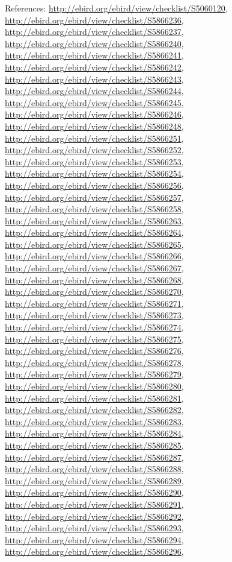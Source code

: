\documentclass[9pt, article]{memoir}
\begin{document}
\begin{multicols}{2}
\vspace{6pt}References: 
\url{http://ebird.org/ebird/view/checklist/S5060120}, 
\url{http://ebird.org/ebird/view/checklist/S5866236}, 
\url{http://ebird.org/ebird/view/checklist/S5866237}, 
\url{http://ebird.org/ebird/view/checklist/S5866240}, 
\url{http://ebird.org/ebird/view/checklist/S5866241}, 
\url{http://ebird.org/ebird/view/checklist/S5866242}, 
\url{http://ebird.org/ebird/view/checklist/S5866243}, 
\url{http://ebird.org/ebird/view/checklist/S5866244}, 
\url{http://ebird.org/ebird/view/checklist/S5866245}, 
\url{http://ebird.org/ebird/view/checklist/S5866246}, 
\url{http://ebird.org/ebird/view/checklist/S5866248}, 
\url{http://ebird.org/ebird/view/checklist/S5866251}, 
\url{http://ebird.org/ebird/view/checklist/S5866252}, 
\url{http://ebird.org/ebird/view/checklist/S5866253}, 
\url{http://ebird.org/ebird/view/checklist/S5866254}, 
\url{http://ebird.org/ebird/view/checklist/S5866256}, 
\url{http://ebird.org/ebird/view/checklist/S5866257}, 
\url{http://ebird.org/ebird/view/checklist/S5866258}, 
\url{http://ebird.org/ebird/view/checklist/S5866263}, 
\url{http://ebird.org/ebird/view/checklist/S5866264}, 
\url{http://ebird.org/ebird/view/checklist/S5866265}, 
\url{http://ebird.org/ebird/view/checklist/S5866266}, 
\url{http://ebird.org/ebird/view/checklist/S5866267}, 
\url{http://ebird.org/ebird/view/checklist/S5866268}, 
\url{http://ebird.org/ebird/view/checklist/S5866270}, 
\url{http://ebird.org/ebird/view/checklist/S5866271}, 
\url{http://ebird.org/ebird/view/checklist/S5866273}, 
\url{http://ebird.org/ebird/view/checklist/S5866274}, 
\url{http://ebird.org/ebird/view/checklist/S5866275}, 
\url{http://ebird.org/ebird/view/checklist/S5866276}, 
\url{http://ebird.org/ebird/view/checklist/S5866278}, 
\url{http://ebird.org/ebird/view/checklist/S5866279}, 
\url{http://ebird.org/ebird/view/checklist/S5866280}, 
\url{http://ebird.org/ebird/view/checklist/S5866281}, 
\url{http://ebird.org/ebird/view/checklist/S5866282}, 
\url{http://ebird.org/ebird/view/checklist/S5866283}, 
\url{http://ebird.org/ebird/view/checklist/S5866284}, 
\url{http://ebird.org/ebird/view/checklist/S5866285}, 
\url{http://ebird.org/ebird/view/checklist/S5866287}, 
\url{http://ebird.org/ebird/view/checklist/S5866288}, 
\url{http://ebird.org/ebird/view/checklist/S5866289}, 
\url{http://ebird.org/ebird/view/checklist/S5866290}, 
\url{http://ebird.org/ebird/view/checklist/S5866291}, 
\url{http://ebird.org/ebird/view/checklist/S5866292}, 
\url{http://ebird.org/ebird/view/checklist/S5866293}, 
\url{http://ebird.org/ebird/view/checklist/S5866294}, 
\url{http://ebird.org/ebird/view/checklist/S5866296}, 

\end{multicols}
\end{document}
